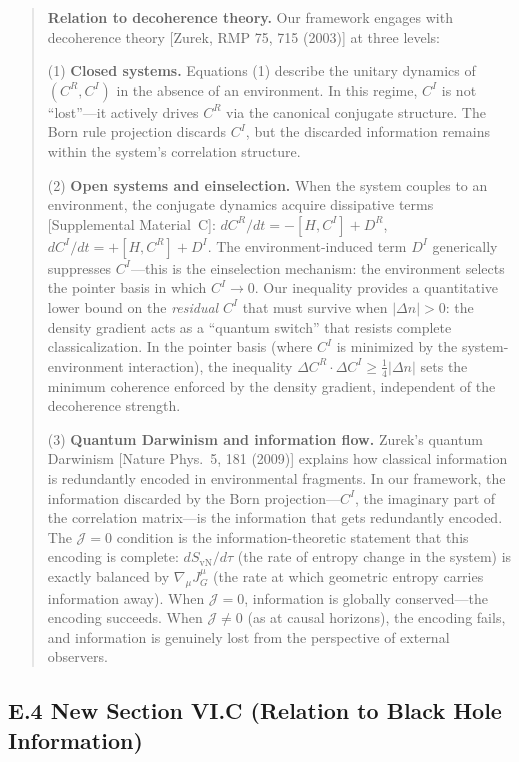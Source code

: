 \documentclass[11pt,a4paper]{article}
\begin{document}
\begin{quote}
\small
\textbf{Relation to decoherence theory.} Our framework engages with decoherence theory [Zurek, RMP 75, 715 (2003)] at three levels:

(1) \textbf{Closed systems.} Equations (1) describe the unitary dynamics of $(C^R, C^I)$ in the absence of an environment. In this regime, $C^I$ is not ``lost''---it actively drives $C^R$ via the canonical conjugate structure. The Born rule projection discards $C^I$, but the discarded information remains within the system's correlation structure.

(2) \textbf{Open systems and einselection.} When the system couples to an environment, the conjugate dynamics acquire dissipative terms [Supplemental Material~C]: $dC^R/dt = -[H, C^I] + D^R$, $dC^I/dt = +[H, C^R] + D^I$. The environment-induced term $D^I$ generically suppresses $C^I$---this is the einselection mechanism: the environment selects the pointer basis in which $C^I \to 0$. Our inequality provides a quantitative lower bound on the \emph{residual} $C^I$ that must survive when $|\Delta n| > 0$: the density gradient acts as a ``quantum switch'' that resists complete classicalization. In the pointer basis (where $C^I$ is minimized by the system-environment interaction), the inequality $\Delta C^R \cdot \Delta C^I \geq \frac{1}{4}|\Delta n|$ sets the minimum coherence enforced by the density gradient, independent of the decoherence strength.

(3) \textbf{Quantum Darwinism and information flow.} Zurek's quantum Darwinism [Nature Phys.\ 5, 181 (2009)] explains how classical information is redundantly encoded in environmental fragments. In our framework, the information discarded by the Born projection---$C^I$, the imaginary part of the correlation matrix---is the information that gets redundantly encoded. The $\mathcal{J}=0$ condition is the information-theoretic statement that this encoding is complete: $dS_{\text{vN}}/d\tau$ (the rate of entropy change in the system) is exactly balanced by $\nabla_\mu J^\mu_G$ (the rate at which geometric entropy carries information away). When $\mathcal{J}=0$, information is globally conserved---the encoding succeeds. When $\mathcal{J} \neq 0$ (as at causal horizons), the encoding fails, and information is genuinely lost from the perspective of external observers.
\end{quote}

\subsection*{E.4 New Section VI.C (Relation to Black Hole Information)}
\end{document}
